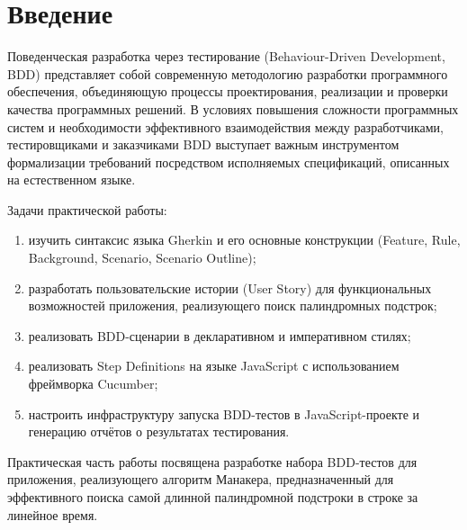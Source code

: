 \chapter*{Введение}

Поведенческая разработка через тестирование (Behaviour-Driven Development, BDD) представляет собой современную методологию разработки программного обеспечения, объединяющую процессы проектирования, реализации и проверки качества программных решений. В условиях повышения сложности программных систем и необходимости эффективного взаимодействия между разработчиками, тестировщиками и заказчиками BDD выступает важным инструментом формализации требований посредством исполняемых спецификаций, описанных на естественном языке.

Задачи практической работы:
\begin{enumerate}
    \item изучить синтаксис языка Gherkin и его основные конструкции (Feature, Rule, Background, Scenario, Scenario Outline);
    \item разработать пользовательские истории (User Story) для функциональных возможностей приложения, реализующего поиск палиндромных подстрок;
    \item реализовать BDD-сценарии в декларативном и императивном стилях;
    \item реализовать Step Definitions на языке JavaScript с использованием фреймворка Cucumber;
    \item настроить инфраструктуру запуска BDD-тестов в JavaScript-проекте и генерацию отчётов о результатах тестирования.
\end{enumerate}

Практическая часть работы посвящена разработке набора BDD-тестов для приложения, реализующего алгоритм Манакера, предназначенный для эффективного поиска самой длинной палиндромной подстроки в строке за линейное время.